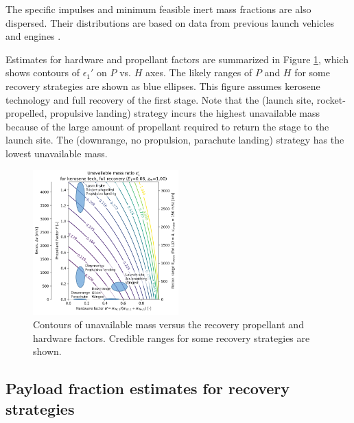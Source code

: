 \documentclass{iaf-iac}
\begin{document}
\begin{multicols}{2}
The specific impulses and minimum feasible inert mass fractions are also dispersed. Their distributions are based on data from previous launch vehicles and engines \cite{Isakowitz2004, hist_lpre}. 

Estimates for hardware and propellant factors are summarized in Figure \ref{fig:unavail_mass_contours}, which shows contours of $\epsilon_1'$ on $P$ vs. $H$ axes. The likely ranges of $P$ and $H$ for some recovery strategies are shown as blue ellipses. This figure assumes kerosene technology and full recovery of the first stage. Note that the (launch site, rocket-propelled, propulsive landing) strategy incurs the highest unavailable mass because of the large amount of propellant required to return the stage to the launch site. The (downrange, no propulsion, parachute landing) strategy has the lowest unavailable mass. 

\begin{figure}[H]
    \centering
    \includegraphics[width=0.5\textwidth]{unavail_mass_contours_annotated}
    \caption{\label{fig:unavail_mass_contours} Contours of unavailable mass versus the recovery propellant and hardware factors. Credible ranges for some recovery strategies are shown.}
\end{figure}


\subsection{Payload fraction estimates for recovery strategies} \label{sec:payload_fraction_est}


\end{multicols}
\end{document}
